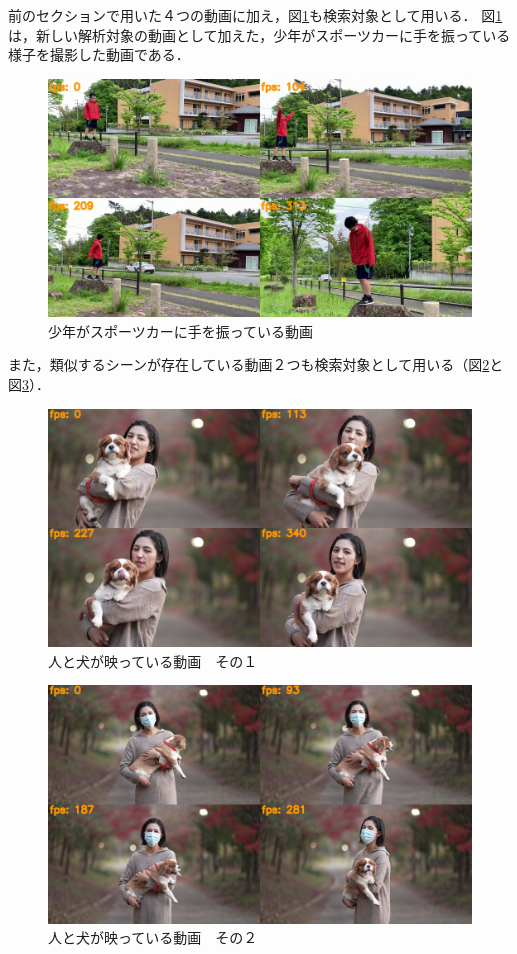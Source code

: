 \documentclass[a4j,12pt,dvipdfmx]{jreport}
\begin{document}
前のセクションで用いた４つの動画に加え，図\ref{fig:movie6}も検索対象として用いる．
図\ref{fig:movie6}は，新しい解析対象の動画として加えた，少年がスポーツカーに手を振っている様子を撮影した動画である．
\begin{figure}[H]
  \centering
  \includegraphics[width=13cm]{image/6_result.jpg}
  \caption{少年がスポーツカーに手を振っている動画}
  \label{fig:movie6}
\end{figure}

また，類似するシーンが存在している動画２つも検索対象として用いる（図\ref{fig:movie7}と図\ref{fig:movie8}）．
\begin{figure}[H]
  \centering
  \includegraphics[width=13cm]{image/7_result.jpg}
  \caption{人と犬が映っている動画　その１}
  \label{fig:movie7}
\end{figure}

\begin{figure}[H]
  \centering
  \includegraphics[width=13cm]{image/8_result.jpg}
  \caption{人と犬が映っている動画　その２}
  \label{fig:movie8}
\end{figure}
\end{document}
